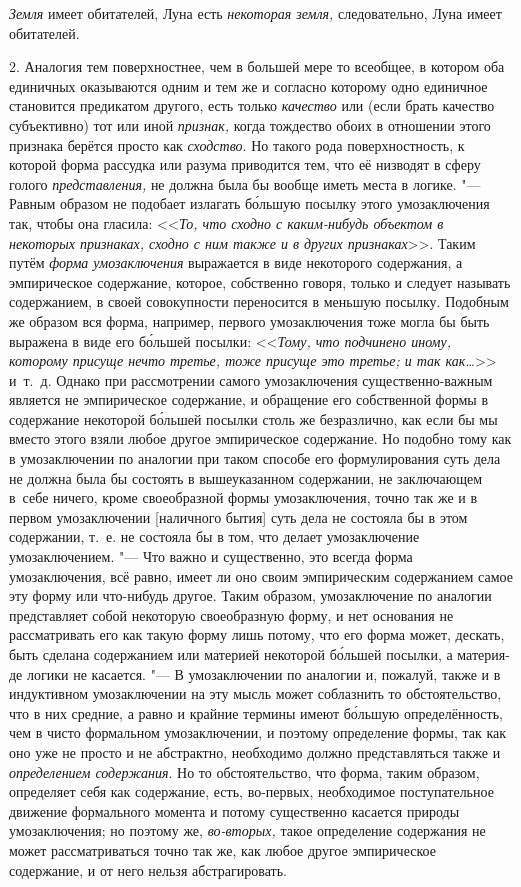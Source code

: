 {\em Земля} имеет обитателей,
Луна есть {\em некоторая земля,}
следовательно, Луна имеет обитателей.

2. Аналогия тем поверхностнее, чем в большей мере то всеобщее,
в котором оба единичных оказываются одним и тем же и согласно которому одно
единичное становится предикатом другого, есть только
{\em качество} или (если
брать качество субъективно) тот или иной
{\em признак,} когда
тождество обоих в отношении этого признака берётся просто как
{\em сходство}. Но такого
рода поверхностность, к которой форма рассудка или разума приводится тем,
что её низводят в сферу голого
{\em представления,} не
должна была бы вообще иметь места в логике. "--- Равным
образом не подобает излагать б\'{о}льшую посылку этого умозаключения так, чтобы
она гласила: <<{\em То, что сходно с
каким-нибудь объектом в некоторых признаках, сходно с ним также и в других
признаках}>>. Таким путём
{\em форма умозаключения}
выражается в виде некоторого содержания, а эмпирическое
содержание, которое, собственно говоря, только и следует называть
содержанием, в своей совокупности переносится в меньшую посылку. Подобным
же образом вся форма, например, первого умозаключения тоже могла бы быть
выражена в виде его б\'{о}льшей посылки:
<<{\em Тому, что подчинено иному, которому присуще нечто третье,
тоже присуще это третье; и так как…}>> и~т.~д. Однако при рассмотрении самого
умозаключения существенно-важным является не эмпирическое содержание, и
обращение его собственной формы в содержание некоторой б\'{о}льшей посылки
столь же безразлично, как если бы мы вместо этого взяли
любое другое эмпирическое содержание. Но подобно тому как в умозаключении
по аналогии при таком способе его формулирования суть дела не должна была
бы состоять в вышеуказанном содержании, не заключающем в~себе ничего, кроме
своеобразной формы умозаключения, точно так же и в первом умозаключении
[наличного бытия] суть дела не состояла бы в этом содержании, т.~е. не
состояла бы в том, что делает умозаключение умозаключением. "---
Что важно и существенно, это всегда форма умозаключения, всё
равно, имеет ли оно своим эмпирическим содержанием самое эту форму или
что-нибудь другое. Таким образом, умозаключение по аналогии представляет
собой некоторую своеобразную форму, и нет основания не рассматривать его
как такую форму лишь потому, что его форма может, дескать, быть сделана
содержанием или материей некоторой б\'{о}льшей посылки, а материя-де логики не
касается. "--- В умозаключении по аналогии и, пожалуй, также и
в индуктивном умозаключении на эту мысль может соблазнить то
обстоятельство, что в них средние, а равно и крайние термины имеют б\'{о}льшую
определённость, чем в чисто формальном умозаключении, и поэтому определение
формы, так как оно уже не просто и не абстрактно, необходимо должно
представляться также и {\em определением
содержания}. Но то обстоятельство, что форма, таким образом,
определяет себя как содержание, есть, во-первых, необходимое поступательное
движение формального момента и потому существенно касается природы
умозаключения; но поэтому же,
{\em во-вторых,} такое
определение содержания не может рассматриваться точно так же, как любое
другое эмпирическое содержание, и от него нельзя абстрагировать.

